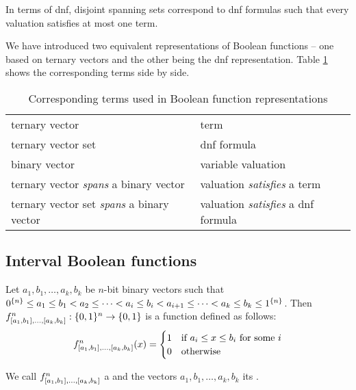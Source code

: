 In terms of \acrshort{dnf},
disjoint spanning sets
correspond to \acrshort{dnf} formulas
such that every valuation satisfies at most one term.

We have introduced two equivalent representations
of Boolean functions --
one based on ternary vectors
and the other being the \acrshort{dnf} representation.
Table \ref{table:representations}
shows the corresponding terms side by side.

\begin{table}[h]
\label{table:representations}
\centering
\begin{tabular}{ll}
ternary vector & term \\
ternary vector set & \acrshort{dnf} formula \\
binary vector & variable valuation \\
ternary vector \emph{spans} a binary vector &
valuation \emph{satisfies} a term \\
ternary vector set \emph{spans} a binary vector &
valuation \emph{satisfies} a \acrshort{dnf} formula
\end{tabular}
\caption{
Corresponding terms used
in Boolean function representations
}
\end{table}

\subsection{Interval Boolean functions}


\begin{definition}
\label{def:kibf}
Let $a_1, b_1, \ldots, a_k, b_k$ be $n$-bit binary vectors
such that $0^{\{n\}} \leq a_1 \leq b_1 < a_2
\leq \cdots < a_i \leq b_i < a_{i+1}
\leq \cdots < a_k \leq b_k \leq 1^{\{n\}}$.
Then $f^n_{[a_1, b_1], \ldots, [a_k, b_k]}: \{0, 1\}{}^n \rightarrow \{0, 1\}{}$ is a function defined as follows:
\[
f^n_{[a_1, b_1], \ldots, [a_k, b_k]} (x) =
\begin{cases}
1 & \text{if } a_i \leq x \leq b_i \text{ for some } i \\
0 & \text{otherwise}
\end{cases}
\]

We call
$f^n_{[a_1, b_1], \ldots, [a_k, b_k]}$
a 
and the vectors $a_1, b_1, \ldots, a_k, b_k$ its
.
\end{definition}


